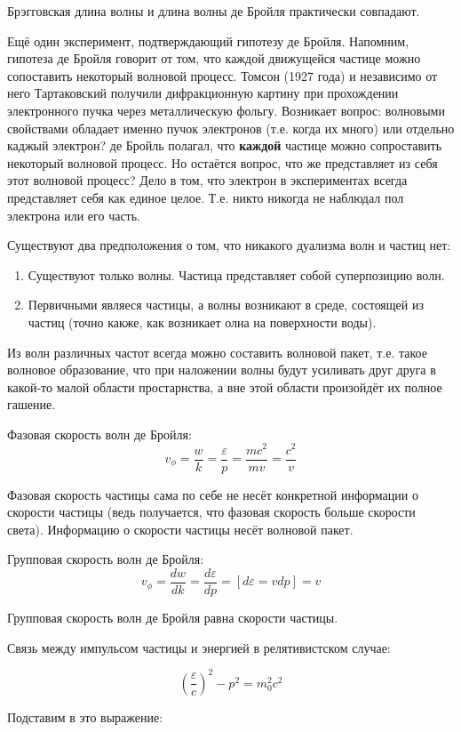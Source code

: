 \documentclass[a4paper,14pt]{article}
\begin{document}
Брэгговская длина волны и длина волны де Бройля практически совпадают.

Ещё один эксперимент, подтверждающий гипотезу де Бройля. Напомним, гипотеза де Бройля говорит от том, что каждой движущейся частице можно сопоставить некоторый волновой процесс. Томсон (1927 года) и независимо от него Тартаковский получили дифракционную картину при прохождении электронного пучка через металлическую фольгу. Возникает вопрос: волновыми свойствами обладает именно пучок электронов (т.е. когда их много) или отдельно каджый электрон? де Бройль полагал, что \textbf{каждой} частице можно сопроставить некоторый волновой процесс. Но остаётся вопрос, что же представляет из себя этот волновой процесс? Дело в том, что электрон в экспериментах всегда представляет себя как единое целое. Т.е. никто никогда не наблюдал пол электрона или его часть.

Существуют два предположения о том, что никакого дуализма волн и частиц нет:
\begin{enumerate}
\item Существуют только волны. Частица представляет собой суперпозицию волн.
\item Первичными являеся частицы, а волны возникают в среде, состоящей из частиц (точно какже, как возникает олна на поверхности воды).
\end{enumerate}

Из волн различных частот всегда можно составить волновой пакет, т.е. такое волновое образование, что при наложении волны будут усиливать друг друга в какой-то малой области простарнства, а вне этой области произойдёт их полное гашение.

Фазовая скорость волн де Бройля: \[v_\phi=\dfrac{w}{k}=\dfrac{\varepsilon}{p}=\dfrac{mc^2}{mv}=\dfrac{c^2}{v}\]

Фазовая скорость частицы сама по себе не несёт конкретной информации о скорости частицы (ведь получается, что фазовая скорость больше скорости света). Информацию о скорости частицы несёт волновой пакет.

Групповая скорость волн де Бройля: \[v_\phi=\dfrac{dw}{dk}=\dfrac{d\varepsilon}{dp}=[d\varepsilon=vdp]=v\]

Групповая скорость волн де Бройля равна скорости частицы.

Связь между импульсом частицы и энергией в релятивистском случае:

\[\left(\dfrac{\varepsilon}{c}\right)^2 - p^2 = m_0^2c^2\]

Подставим в это выражение:
\end{document}
